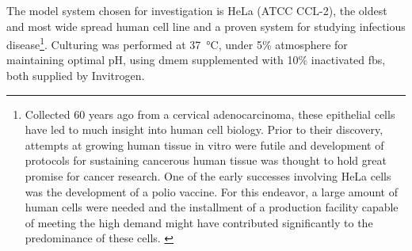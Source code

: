 The model system chosen for investigation is HeLa (ATCC CCL-2), the oldest and most wide spread human cell line and a proven system for studying infectious disease\footnote{Collected 60 years ago from a cervical adenocarcinoma, these epithelial cells have led to much insight into human cell biology. Prior to their discovery, attempts at growing human tissue in vitro were futile and development of protocols for sustaining cancerous human tissue was thought to hold great promise for cancer research. One of the early successes involving HeLa cells was the development of a polio vaccine. For this endeavor, a large amount of human cells were needed and the installment of a production facility capable of meeting the high demand might have contributed significantly to the predominance of these cells. \citep{Masters2002}}. Culturing was performed at \SI{37}{\celsius}, under 5\%  atmosphere for maintaining optimal pH, using \gls{dmem}  supplemented with 10\% inactivated \gls{fbs}, both supplied by Invitrogen.

